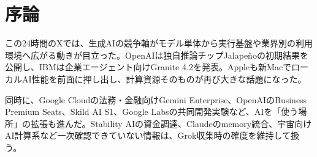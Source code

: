 \section*{序論}
この24時間のXでは、生成AIの競争軸がモデル単体から実行基盤や業界別の利用環境へ広がる動きが目立った。OpenAIは独自推論チップJalapeñoの初期結果を公開し、IBMは企業エージェント向けGranite 4.2を発表。Appleも新MacでローカルAI性能を前面に押し出し、計算資源そのものが再び大きな話題になった。

同時に、Google Cloudの法務・金融向けGemini Enterprise、OpenAIのBusiness Premium Seats、Skild AI S1、Google Labsの共同開発実験など、AIを「使う場所」の拡張も進んだ。Stability AIの資金調達、Claudeのmemory統合、宇宙向けAI計算系など一次確認できていない情報は、Grok収集時の確度を維持して扱う。
